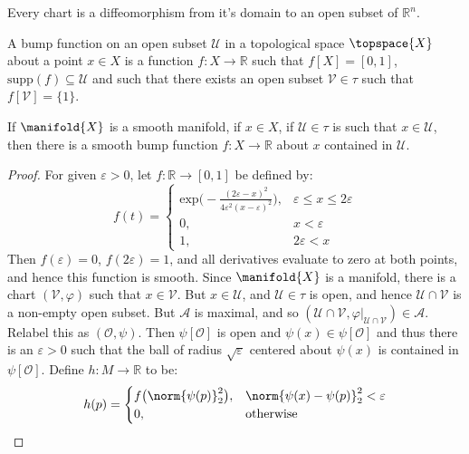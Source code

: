         Every chart is a diffeomorphism from it's domain to an open subset
        of $\mathbb{R}^{n}$.
        \begin{definition}
            A bump function on an open subset $\mathcal{U}$ in a topological
            space $\topspace{X}$ about a point $x\in{X}$ is a function
            $f:X\rightarrow\mathbb{R}$ such that $f[X]=[0,1]$,
            $\textrm{supp}(f)\subseteq\mathcal{U}$ and such that there
            exists an open subset $\mathcal{V}\in\tau$ such that
            $f[\mathcal{V}]=\{1\}$.
        \end{definition}
        \begin{theorem}
            If $\manifold{X}$ is a smooth manifold, if $x\in{X}$, if
            $\mathcal{U}\in\tau$ is such that $x\in\mathcal{U}$, then there
            is a smooth bump function $f:X\rightarrow\mathbb{R}$ about $x$
            contained in $\mathcal{U}$.
        \end{theorem}
        \begin{proof}
            For given $\varepsilon>0$, let $f:\mathbb{R}\rightarrow[0,1]$ be
            defined by:
            \begin{equation}
                f(t)=\begin{cases}
                    \textrm{exp}\Big(
                        \minus\frac{(2\varepsilon-x)^{2}}
                            {4\varepsilon^{2}(x-\varepsilon)^{2}}
                        \Big),&\varepsilon\leq{x}\leq{2}\varepsilon\\
                        0,&x<\varepsilon\\
                        1,&2\varepsilon<x
                \end{cases}
            \end{equation}
            Then $f(\varepsilon)=0$, $f(2\varepsilon)=1$, and all
            derivatives evaluate to zero at both points, and hence this
            function is smooth. Since $\manifold{X}$ is a manifold, there is
            a chart $(\mathcal{V},\varphi)$ such that $x\in\mathcal{V}$.
            But $x\in\mathcal{U}$, and $\mathcal{U}\in\tau$ is open, and
            hence $\mathcal{U}\cap\mathcal{V}$ is a non-empty open subset.
            But $\mathcal{A}$ is maximal, and so
            $(\mathcal{U}\cap\mathcal{V},%
             \varphi|_{\mathcal{U}\cap\mathcal{V}})\in\mathcal{A}$.
            Relabel this as $(\mathcal{O},\psi)$. Then
            $\psi[\mathcal{O}]$ is open and $\psi(x)\in\psi[\mathcal{O}]$
            and thus there is an $\varepsilon>0$ such that the ball of
            radius $\sqrt{\varepsilon}$ centered about $\psi(x)$ is
            contained in $\psi[\mathcal{O}]$. Define
            $h:M\rightarrow\mathbb{R}$ to be:
            \begin{equation}
                h(p)=
                \begin{cases}
                    f\big(\norm{\psi(p)}_{2}^{2}\big),
                        &\norm{\psi(x)-\psi(p)}_{2}^{2}<\varepsilon\\
                    0,&\textrm{otherwise}
                \end{cases}
            \end{equation}
        \end{proof}
